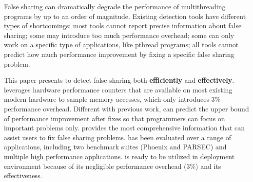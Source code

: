 False sharing can dramatically degrade the performance of multithreading programs by up to an order of magnitude. 
Existing detection tools have different types of shortcomings: most tools cannot report precise information about false sharing; some may introduce too much performance overhead; some can only work on a specific type of applications, like pthread programs; all tools cannot predict how much performance improvement by fixing a specific false sharing problem. 

This paper presents \cheetah{} to detect false sharing both {\bf efficiently} and {\bf effectively}. \cheetah{} leverages hardware performance counters that are available on most existing modern hardware to sample memory accesses, which only introduces 3\% performance overhead. Different with previous work, \cheetah{} can predict the upper bound of performance improvement after fixes so that programmers can focus on important problems only. \cheetah{} provides the most comprehensive information that can assist users to fix false sharing problems. \cheetah{} has been evaluated over a range of applications, including two benchmark suites (Phoenix and PARSEC) and multiple high performance applications. \Cheetah{} is ready to be utilized in deployment environment because of its negligible performance overhead (3\%) and its effectiveness.  